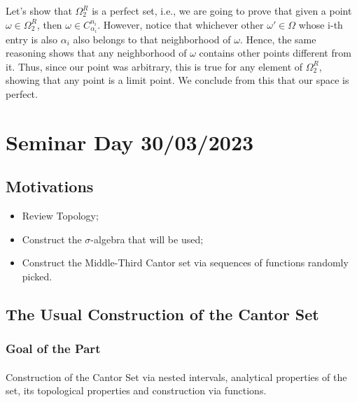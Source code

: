 \documentclass{article}
\begin{document}
Let's show that $\Omega _{2} ^{R}$ is a perfect set, i.e., we are going to prove that given a point $\omega\in\Omega _{2}^{R}$,
then $\omega\in{C _{\alpha_i}^{n_i}}.$ However, notice that whichever other $\omega'\in\Omega$ whose i-th entry is also
$\alpha_i$ also belongs to that neighborhood of $\omega$. Hence, the same reasoning shows that any neighborhood of
$\omega$ contains other points different from it. Thus, since our point was arbitrary, this is true for any element
of $\Omega _{2}^{R}$, showing that any point is a limit point. We conclude from this that our space is perfect.
\newpage

\section{Seminar Day 30/03/2023}
\subsection{Motivations}
\begin{itemize}
  \item Review Topology;
  \item Construct the $\sigma$-algebra that will be used;
  \item Construct the Middle-Third Cantor set via sequences of functions randomly picked.
\end{itemize}

\subsection{The Usual Construction of the Cantor Set}
\subsubsection{Goal of the Part}
 \paragraph{} Construction of the Cantor Set via nested intervals, analytical properties of the set, its topological properties and construction
via functions.
\end{document}
